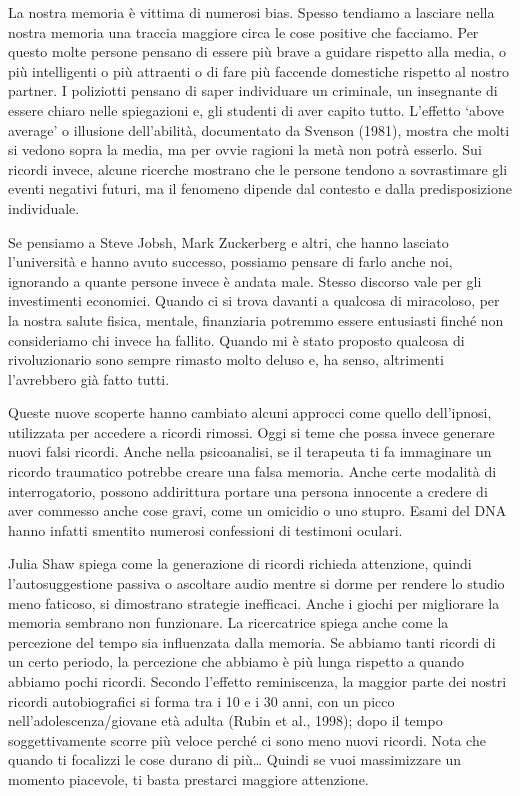 \documentclass[12pt]{book} %
\begin{document}
\begin{mdframed}[linewidth=1pt]
La nostra memoria è vittima di numerosi bias. Spesso tendiamo a lasciare nella nostra memoria una traccia
maggiore circa le cose positive che facciamo. Per questo molte persone pensano di essere più brave a guidare rispetto
alla media, o più intelligenti o più attraenti o di fare più faccende domestiche rispetto al nostro partner. I
poliziotti pensano di saper individuare un criminale, un insegnante di essere chiaro nelle spiegazioni e, gli studenti di aver capito tutto. 
L’effetto ‘above average’ o illusione dell’abilità, documentato da Svenson (1981), mostra che molti si vedono sopra la media, ma per ovvie ragioni la metà non potrà esserlo.
Sui ricordi invece, alcune ricerche mostrano che le persone tendono a sovrastimare gli eventi negativi futuri, ma il fenomeno dipende dal contesto e dalla predisposizione individuale.

Se pensiamo a Steve Jobsh, Mark Zuckerberg e altri, che hanno lasciato l'università e hanno avuto successo, possiamo pensare di farlo
anche noi, ignorando a quante persone invece è andata male. Stesso discorso vale per gli investimenti economici. Quando
ci si trova davanti a qualcosa di miracoloso, per la nostra salute fisica, mentale, finanziaria potremmo essere
entusiasti finché non consideriamo chi invece ha fallito. Quando mi è stato proposto qualcosa di rivoluzionario sono sempre rimasto molto deluso e, ha senso, altrimenti l'avrebbero già fatto tutti.

Queste nuove scoperte hanno cambiato alcuni approcci come quello dell'ipnosi, utilizzata per accedere a ricordi rimossi.
Oggi si teme che possa invece generare nuovi falsi ricordi. 
Anche nella psicoanalisi, se il terapeuta ti fa immaginare un ricordo traumatico potrebbe creare una falsa memoria. Anche certe modalità di interrogatorio, possono addirittura portare una persona innocente a credere di
aver commesso anche cose gravi, come un omicidio o uno stupro. Esami del DNA hanno infatti smentito numerosi confessioni di testimoni oculari.

Julia Shaw spiega come la generazione di ricordi richieda attenzione, quindi l'autosuggestione
passiva o ascoltare audio mentre si dorme per rendere lo studio meno faticoso, si dimostrano strategie inefficaci.
Anche i giochi per migliorare la memoria sembrano non funzionare. La ricercatrice spiega anche come la percezione del
tempo sia influenzata dalla memoria. Se abbiamo tanti ricordi di un certo periodo, la percezione che abbiamo è più
lunga rispetto a quando abbiamo pochi ricordi. Secondo l’effetto reminiscenza, la maggior parte dei nostri ricordi autobiografici si forma tra i 10 e i 30 anni, con un picco nell’adolescenza/giovane età adulta (Rubin et al., 1998); dopo il tempo soggettivamente scorre più veloce perché ci sono meno nuovi ricordi.
Nota che quando ti focalizzi le cose durano di più… Quindi se vuoi massimizzare un momento piacevole, ti basta prestarci maggiore attenzione.
\end{mdframed}
\end{document}
